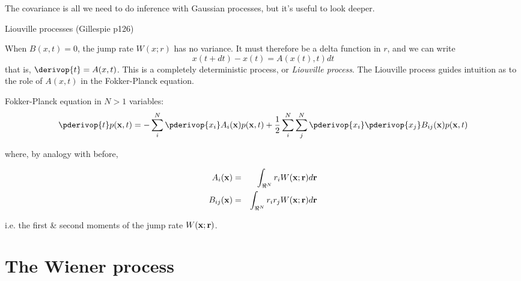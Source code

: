 \documentclass{beamer}
\begin{document}
\begin{frame}{}
  The covariance is all we need to do inference with Gaussian processes, but it's useful to look deeper.

  Liouville processes (Gillespie p126)
 
  When $B(x,t)=0$, the jump rate $W(x;r)$ has no variance.
It must therefore be a delta function in $r$, and we can write
\[
x(t+dt) - x(t) = A(x(t),t) dt
\]
that is, $\derivop{t} = A(x,t)$.
  This is a completely deterministic process, or {\em Liouville process}.
  The Liouville process guides intuition as to the role of $A(x,t)$ in the Fokker-Planck equation.
 


\end{frame}

\begin{frame}{}

Fokker-Planck equation in $N>1$ variables:
\[
\pderivop{t} p({\bf x},t) = -\sum_i^N \pderivop{x_i} A_i({\bf x})p({\bf x},t) + \frac{1}{2} \sum_i^N \sum_j^N \pderivop{x_i} \pderivop{x_j} B_{ij}({\bf x})p({\bf x},t)
\]

where, by analogy with before, 

\begin{eqnarray*}
  A_i({\bf x}) & = & \int_{\Re^N} r_i W({\bf x};{\bf r}) d{\bf r} \\
B_{ij}({\bf x}) & = & \int_{\Re^N} r_i r_j W({\bf x};{\bf r}) d{\bf r}
\end{eqnarray*}

i.e. the first \& second moments of the jump rate $W({\bf x};{\bf r})$.

\end{frame}

\section{The Wiener process}
\end{document}
